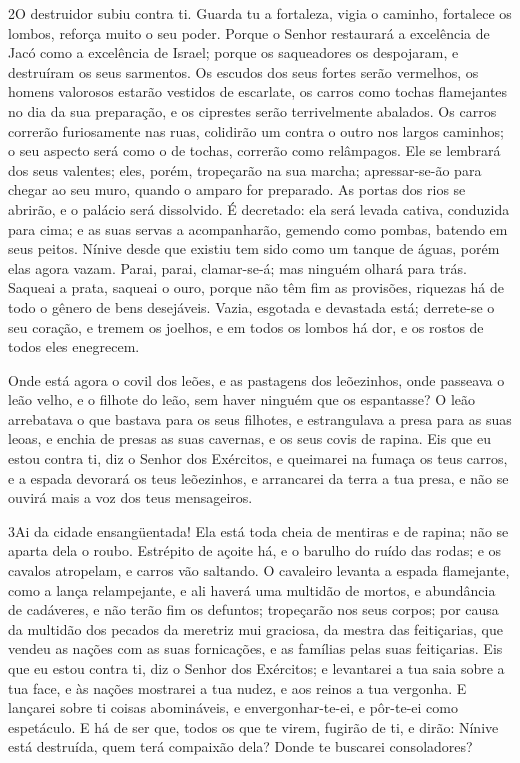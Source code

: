 \lettrine{2} O destruidor subiu contra ti. Guarda tu a
fortaleza, vigia o caminho, fortalece os lombos, reforça muito o seu
poder. Porque o Senhor restaurará a excelência de Jacó como a
excelência de Israel; porque os saqueadores os despojaram, e
destruíram os seus sarmentos. Os escudos dos seus fortes serão
vermelhos, os homens valorosos estarão vestidos de escarlate, os
carros como tochas flamejantes no dia da sua preparação, e os
ciprestes serão terrivelmente abalados. Os carros correrão
furiosamente nas ruas, colidirão um contra o outro nos largos
caminhos; o seu aspecto será como o de tochas, correrão como
relâmpagos. Ele se lembrará dos seus valentes; eles, porém,
tropeçarão na sua marcha; apressar-se-ão para chegar ao seu muro,
quando o amparo for preparado. As portas dos rios se abrirão, e
o palácio será dissolvido. É decretado: ela será levada cativa,
conduzida para cima; e as suas servas a acompanharão, gemendo como
pombas, batendo em seus peitos. Nínive desde que existiu tem
sido como um tanque de águas, porém elas agora vazam. Parai, parai,
clamar-se-á; mas ninguém olhará para trás. Saqueai a prata,
saqueai o ouro, porque não têm fim as provisões, riquezas há de todo
o gênero de bens desejáveis. Vazia, esgotada e devastada
está; derrete-se o seu coração, e tremem os joelhos, e em todos os
lombos há dor, e os rostos de todos eles enegrecem.

Onde está agora o covil dos leões, e as pastagens dos leõezinhos,
onde passeava o leão velho, e o filhote do leão, sem haver ninguém
que os espantasse? O leão arrebatava o que bastava para os
seus filhotes, e estrangulava a presa para as suas leoas, e enchia
de presas as suas cavernas, e os seus covis de rapina. Eis
que eu estou contra ti, diz o Senhor dos Exércitos, e queimarei na
fumaça os teus carros, e a espada devorará os teus leõezinhos, e
arrancarei da terra a tua presa, e não se ouvirá mais a voz dos teus
mensageiros.

\medskip

\lettrine{3} Ai da cidade ensangüentada! Ela está toda cheia
de mentiras e de rapina; não se aparta dela o roubo. Estrépito
de açoite há, e o barulho do ruído das rodas; e os cavalos
atropelam, e carros vão saltando. O cavaleiro levanta a espada
flamejante, como a lança relampejante, e ali haverá uma multidão de
mortos, e abundância de cadáveres, e não terão fim os defuntos;
tropeçarão nos seus corpos; por causa da multidão dos pecados da
meretriz mui graciosa, da mestra das feitiçarias, que vendeu as
nações com as suas fornicações, e as famílias pelas suas
feitiçarias. Eis que eu estou contra ti, diz o Senhor dos
Exércitos; e levantarei a tua saia sobre a tua face, e às nações
mostrarei a tua nudez, e aos reinos a tua vergonha. E lançarei
sobre ti coisas abomináveis, e envergonhar-te-ei, e pôr-te-ei como
espetáculo. E há de ser que, todos os que te virem, fugirão de
ti, e dirão: Nínive está destruída, quem terá compaixão dela? Donde
te buscarei consoladores?

